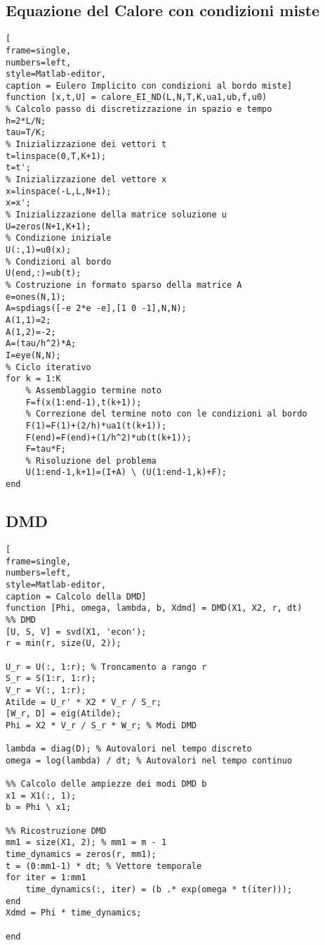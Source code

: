 \documentclass[11pt]{article}
\begin{document}
\subsection{Equazione del Calore con condizioni miste}\label{heat}
\begin{lstlisting}[
frame=single,
numbers=left,
style=Matlab-editor,
caption = Eulero Implicito con condizioni al bordo miste]
function [x,t,U] = calore_EI_ND(L,N,T,K,ua1,ub,f,u0)
% Calcolo passo di discretizzazione in spazio e tempo
h=2*L/N;
tau=T/K;
% Inizializzazione dei vettori t
t=linspace(0,T,K+1);
t=t';
% Inizializzazione del vettore x
x=linspace(-L,L,N+1);
x=x';
% Inizializzazione della matrice soluzione u
U=zeros(N+1,K+1);
% Condizione iniziale
U(:,1)=u0(x);
% Condizioni al bordo
U(end,:)=ub(t);
% Costruzione in formato sparso della matrice A
e=ones(N,1);
A=spdiags([-e 2*e -e],[1 0 -1],N,N);
A(1,1)=2;
A(1,2)=-2;
A=(tau/h^2)*A;
I=eye(N,N);
% Ciclo iterativo
for k = 1:K
    % Assemblaggio termine noto
    F=f(x(1:end-1),t(k+1));
    % Correzione del termine noto con le condizioni al bordo
    F(1)=F(1)+(2/h)*ua1(t(k+1));
    F(end)=F(end)+(1/h^2)*ub(t(k+1));
    F=tau*F;
    % Risoluzione del problema
    U(1:end-1,k+1)=(I+A) \ (U(1:end-1,k)+F);
end
\end{lstlisting}
\newpage
\subsection{DMD}\label{dmd}
\begin{lstlisting}[
frame=single,
numbers=left,
style=Matlab-editor,
caption = Calcolo della DMD]
function [Phi, omega, lambda, b, Xdmd] = DMD(X1, X2, r, dt)
%% DMD
[U, S, V] = svd(X1, 'econ');
r = min(r, size(U, 2));

U_r = U(:, 1:r); % Troncamento a rango r
S_r = S(1:r, 1:r);
V_r = V(:, 1:r);
Atilde = U_r' * X2 * V_r / S_r; 
[W_r, D] = eig(Atilde);
Phi = X2 * V_r / S_r * W_r; % Modi DMD

lambda = diag(D); % Autovalori nel tempo discreto
omega = log(lambda) / dt; % Autovalori nel tempo continuo

%% Calcolo delle ampiezze dei modi DMD b
x1 = X1(:, 1);
b = Phi \ x1;

%% Ricostruzione DMD
mm1 = size(X1, 2); % mm1 = m - 1
time_dynamics = zeros(r, mm1);
t = (0:mm1-1) * dt; % Vettore temporale
for iter = 1:mm1
    time_dynamics(:, iter) = (b .* exp(omega * t(iter)));
end
Xdmd = Phi * time_dynamics;

end
\end{lstlisting}
\end{document}
